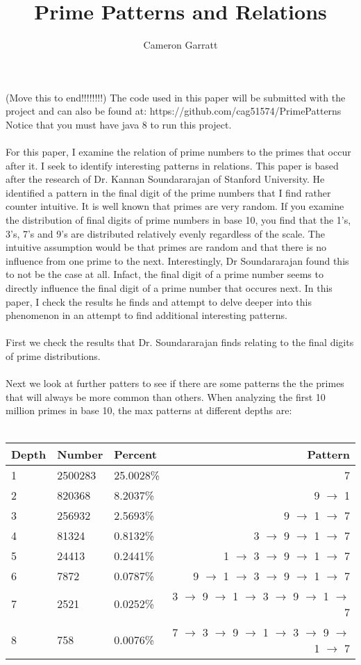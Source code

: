 \documentclass[13pt]{article}
\title{Prime Patterns and Relations}
\author{Cameron Garratt}
\begin{document}
\maketitle
\large
(Move this to end!!!!!!!!) The code used in this paper will be submitted with the project and can also be found at: https://github.com/cag51574/PrimePatterns\\ Notice that you must have java 8 to run this project.\\\\
For this paper, I examine the relation of prime numbers to the primes that occur after it. 
I seek to identify interesting patterns in relations. 
This paper is based after the research of Dr. 
Kannan Soundararajan of Stanford University. 
He identified a pattern in the final digit of the prime numbers that I find rather counter intuitive. 
It is well known that primes are very random. 
If you examine the distribution of final digits of prime numbers in base 10, you find that the 1's, 3's, 7's and 9's are distributed relatively evenly regardless of the scale. 
The intuitive assumption would be that primes are random and that there is no influence from one prime to the next. 
Interestingly, Dr Soundararajan found this to not be the case at all. 
Infact, the final digit of a prime number seems to directly influence the final digit of a prime number that occures next.
In this paper, I check the results he finds and attempt to delve deeper into this phenomenon in an attempt to find additional interesting patterns.\\\\
\indent
First we check the results that Dr. Soundararajan finds relating to the final digits of prime distributions. 
\\\\\indent
Next we look at further patters to see if there are some patterns the the primes that will always be more common than others.
When analyzing the first 10 million primes in base 10, the max patterns at different depths are:\\\\
\begin{tabular}{ l l l r }
  Depth & Number & Percent & Pattern \\
  \hline
  1 & 2500283 & 25.0028\% & 7\\
  2 & 820368 & 8.2037\% & 9 $\rightarrow$ 1\\
  3 & 256932 & 2.5693\% & 9 $\rightarrow$ 1 $\rightarrow$ 7\\
  4 & 81324 & 0.8132\% & 3 $\rightarrow$ 9 $\rightarrow$ 1 $\rightarrow$ 7\\
  5 & 24413 & 0.2441\% & 1 $\rightarrow$ 3 $\rightarrow$ 9 $\rightarrow$ 1 $\rightarrow$ 7\\
  6 & 7872 & 0.0787\% & 9 $\rightarrow$ 1 $\rightarrow$ 3 $\rightarrow$ 9 $\rightarrow$ 1 $\rightarrow$ 7\\
  7 & 2521 & 0.0252\% & 3 $\rightarrow$ 9 $\rightarrow$ 1 $\rightarrow$ 3 $\rightarrow$ 9 $\rightarrow$ 1 $\rightarrow$ 7\\
  8 & 758 & 0.0076\% & 7 $\rightarrow$ 3 $\rightarrow$ 9 $\rightarrow$ 1 $\rightarrow$ 3 $\rightarrow$ 9 $\rightarrow$ 1 $\rightarrow$ 7\\
  \end{tabular}
\end{document}
